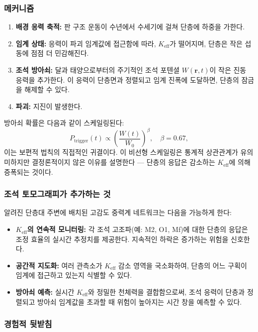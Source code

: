 \documentclass[12pt,a4paper]{article}
\theoremstyle{remark}
\begin{document}
	\subsubsection{메커니즘}
	
	\begin{enumerate}
		\item \textbf{배경 응력 축적:} 판 구조 운동이 수년에서 수세기에 걸쳐 단층에 하중을 가한다.
		\item \textbf{임계 상태:} 응력이 파괴 임계값에 접근함에 따라, \(K_{\mathrm{eff}}\)가 떨어지며, 단층은 작은 섭동에 점점 더 민감해진다.
		\item \textbf{조석 방아쇠:} 달과 태양으로부터의 주기적인 조석 포텐셜 \(W(\mathbf{r},t)\)이 작은 진동 응력을 추가한다. 이 응력이 단층면과 정렬되고 임계 진폭에 도달하면, 단층의 잠금을 해제할 수 있다.
		\item \textbf{파괴:} 지진이 발생한다.
	\end{enumerate}
	
	방아쇠 확률은 다음과 같이 스케일링된다:
	\[
	P_{\text{trigger}}(t) \propto \left( \frac{W(t)}{W_0} \right)^{\beta}, \quad \beta = 0.67,
	\]
	이는 보편적 법칙의 직접적인 귀결이다. 이 비선형 스케일링은 통계적 상관관계가 유의미하지만 결정론적이지 않은 이유를 설명한다 — 단층의 응답은 감소하는 \(K_{\mathrm{eff}}\)에 의해 증폭되는 것이다.
	
	\subsubsection{조석 토모그래피가 추가하는 것}
	
	알려진 단층대 주변에 배치된 고감도 중력계 네트워크는 다음을 가능하게 한다:
	
	\begin{itemize}
		\item \textbf{\(K_{\mathrm{eff}}\)의 연속적 모니터링:} 각 조석 고조파(예: M2, O1, Mf)에 대한 단층의 응답은 조정 효율의 실시간 추정치를 제공한다. 지속적인 하락은 증가하는 위험을 신호한다.
		\item \textbf{공간적 지도화:} 여러 관측소가 \(K_{\mathrm{eff}}\) 감소 영역을 국소화하여, 단층의 어느 구획이 임계에 접근하고 있는지 식별할 수 있다.
		\item \textbf{방아쇠 예측:} 실시간 \(K_{\mathrm{eff}}\)와 정밀한 천체력을 결합함으로써, 조석 응력이 단층과 정렬되고 방아쇠 임계값을 초과할 때 위험이 높아지는 시간 창을 예측할 수 있다.
	\end{itemize}
	
	\subsubsection{경험적 뒷받침}
	
\end{document}
